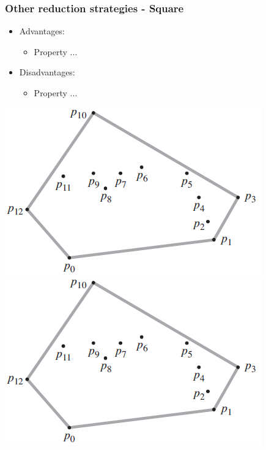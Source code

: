 \begin{frame}
\frametitle{Other reduction strategies - Square}
\begin{multicols}{2}
	\begin{itemize}
		\item Advantages:
		\begin{itemize}
			\item Property ...
		\end{itemize}
		\item Disadvantages:
		\begin{itemize}
			\item Property ...
		\end{itemize}
	\end{itemize}
\columnbreak
	\begin{center}
		\includegraphics[scale=0.5]{graphics/convexHull-example}\\
		\includegraphics[scale=0.5]{graphics/convexHull-example}
	\end{center}
\end{multicols}
\end{frame}
